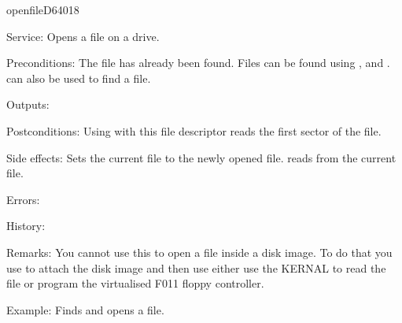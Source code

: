 \newpage
\begin{hyppotrap}{openfile}{D640}{18}
\item [Service:]
  Opens a file on a drive.
\item [Preconditions:]
  The file has already been found. Files can be found using ,
   and .  can also be
  used to find a file.
\item [Outputs:]
\item [Postconditions:]
  Using  with this file descriptor reads the first sector of
  the file.
\item [Side effects:]
  Sets the current file to the newly opened file.  reads
  from the current file.
\item [Errors:]
\item [History:]
\item [Remarks:]
  You cannot use this to open a file inside a disk image. To do that you use
   to attach the disk image and then use either use the KERNAL
  to read the file or program the virtualised F011 floppy controller.
\item [Example:]
  Finds and opens a file.
\end{hyppotrap}


